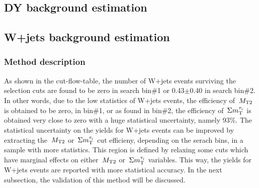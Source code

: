 \subsection{DY background estimation}
\subsection{W+jets background estimation}
\subsubsection{Method description}
As shown in the cut-flow-table, the number of W+jets events surviving the selection cuts are found to be zero in search bin\#1 or 0.43$\pm$0.40 in search bin\#2. In other words, due to the low statistics of W+jets events, the efficiency of $\,{M_{\rm T2}}$ is obtained to be zero, in bin\#1, or as found in bin\#2, the efficiency of $\,\Sigma m_{\rm T}^{\tau_i}$ is obtained very close to zero with a huge statistical uncertainty, namely 93\%. The statistical uncertainty on the yields for W+jets events can be improved by extracting the $\,{M_{\rm T2}}$ or $\,\Sigma m_{\rm T}^{\tau_i}$ cut efficieny, depending on the serach bins, in a sample with more statistics. This region is defined by relaxing some cuts which have marginal effects on either $\,{M_{\rm T2}}$ or $\,\Sigma m_{\rm T}^{\tau_i}$ variables. This way, the yields for W+jets events are reported with more statistical accuracy. In the next subsection, the validation of this method will be discussed.\\

